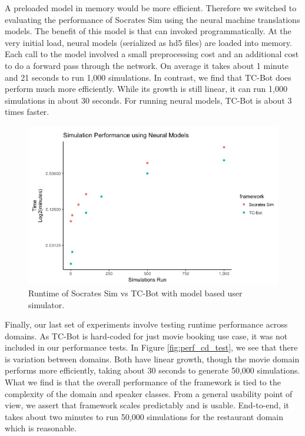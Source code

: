 A preloaded model in memory would be more efficient. Therefore we switched to evaluating the performance of Socrates Sim using the\cite{brownlee_2017} neural machine translations models. The benefit of this model is that can invoked programmatically. At the very initial load, neural models (serialized as hd5 files) are loaded into memory. Each call to the model involved a small preprocessing cost and an additional cost to do a forward pass through the network.  On average it takes about 1 minute and 21 seconds to run 1,000 simulations. In contrast, we find that TC-Bot does perform much more efficiently. While its growth is still linear, it can run 1,000 simulations in about 30 seconds. For running neural models, TC-Bot is about 3 times faster. 

\begin{figure}[h!]
	\centering
	\label{fig:nm_test}
	\includegraphics[width=\linewidth]{diagrams/neural_perf_test.jpeg}
	\caption{ Runtime of Socrates Sim vs TC-Bot with model based user simulator.}
\end{figure}

 Finally, our last set of experiments involve testing runtime performance across domains. As TC-Bot is hard-coded for just movie booking use case, it was not included in our performance tests. In Figure \ref{fig:perf_cd_test}, we see that there is variation between domains. Both have linear growth, though the movie domain performs more efficiently, taking about 30 seconds to generate 50,000 simulations. What we find is that the overall performance of the framework is tied to the complexity of the domain and speaker classes. From a general usability point of view, we assert that framework scales predictably and is usable. End-to-end, it takes about two minutes to run 50,000 simulations for the restaurant domain which is reasonable. 
 
